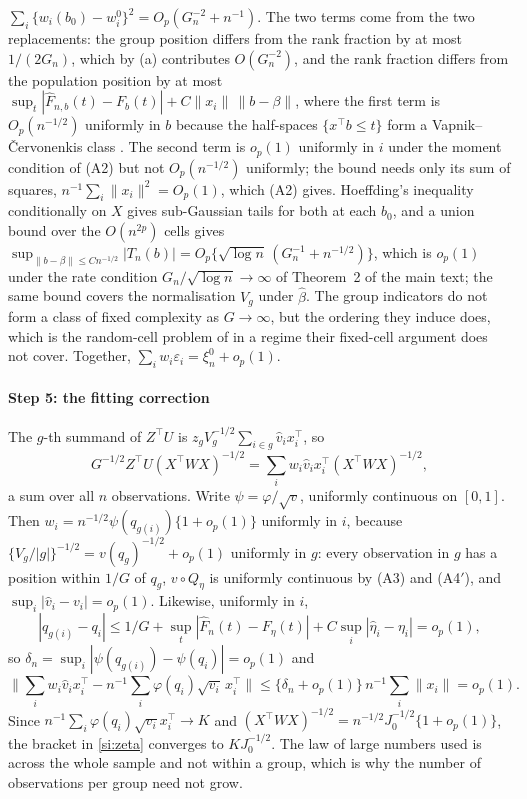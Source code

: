 \documentclass[11pt]{article}
\begin{document}
$\sum_i\{w_i(b_0)-w_i^0\}^2=O_p(G_n^{-2}+n^{-1})$. The two terms come from the two replacements: the
group position differs from the rank fraction by at most $1/(2G_n)$, which by (a) contributes
$O(G_n^{-2})$, and the rank fraction differs from the population position by at most
$\sup_t|\hat F_{n,b}(t)-F_b(t)|+C\|x_i\|\,\|b-\beta\|$, where the first term is $O_p(n^{-1/2})$ uniformly
in $b$ because the half-spaces $\{x^\top b\le t\}$ form a Vapnik--\v{C}ervonenkis class
\citep[Section 2.6]{vandervaartwellner1996}. The second term is $o_p(1)$ uniformly in $i$ under the
moment condition of (A2) but not $O_p(n^{-1/2})$ uniformly; the bound needs only its sum of squares,
$n^{-1}\sum_i\|x_i\|^2=O_p(1)$, which (A2) gives. Hoeffding's inequality conditionally on $X$ gives
sub-Gaussian tails for both at each $b_0$, and a union bound over the $O(n^{2p})$ cells gives
$\sup_{\|b-\beta\|\le Cn^{-1/2}}|T_n(b)|=O_p\{\sqrt{\log n}\,(G_n^{-1}+n^{-1/2})\}$, which is
$o_p(1)$ under the rate condition $G_n/\sqrt{\log n}\to\infty$ of Theorem~2 of the main text; the
same bound covers the normalisation $V_g$ under $\hat\beta$. The group indicators do not form a
class of fixed complexity as $G\to\infty$, but the ordering they induce does, which is the random-cell
problem of \citet{Moore1975} in a regime their fixed-cell argument does not cover. Together,
$\sum_iw_i\varepsilon_i=\xi_n^0+o_p(1)$.

\paragraph{Step 5: the fitting correction} The $g$-th summand of $Z^\top U$ is
$z_gV_g^{-1/2}\sum_{i\in g}\hat v_ix_i^\top$, so
\[
G^{-1/2}Z^\top U(X^\top WX)^{-1/2}=\sum_iw_i\hat v_ix_i^\top(X^\top WX)^{-1/2},
\]
a sum over all $n$ observations. Write $\psi=\varphi/\sqrt v$,
uniformly continuous on $[0,1]$. Then $w_i=n^{-1/2}\psi(q_{g(i)})\{1+o_p(1)\}$ uniformly in $i$,
because $\{V_g/|g|\}^{-1/2}=v(q_g)^{-1/2}+o_p(1)$ uniformly in $g$: every observation in $g$ has a
position within $1/G$ of $q_g$, $v\circ Q_\eta$ is uniformly continuous by (A3) and (A4$'$), and
$\sup_i|\hat v_i-v_i|=o_p(1)$. Likewise, uniformly in $i$,
\[
|q_{g(i)}-q_i|\le1/G+\sup_t|\hat F_n(t)-F_\eta(t)|+C\sup_i|\hat\eta_i-\eta_i|=o_p(1),
\]
so $\delta_n=\sup_i|\psi(q_{g(i)})-\psi(q_i)|=o_p(1)$ and
\[
\Big\|\sum_iw_i\hat v_ix_i^\top-n^{-1}\sum_i\varphi(q_i)\sqrt{v_i}\,x_i^\top\Big\|
\le\{\delta_n+o_p(1)\}\,n^{-1}\sum_i\|x_i\|=o_p(1).
\]
Since $n^{-1}\sum_i\varphi(q_i)\sqrt{v_i}x_i^\top\to K$ and $(X^\top WX)^{-1/2}=n^{-1/2}J_0^{-1/2}
\{1+o_p(1)\}$, the bracket in \eqref{si:zeta} converges to $KJ_0^{-1/2}$. The law of large numbers
used is across the whole sample and not within a group, which is why the number of observations per
group need not grow.
\end{document}
